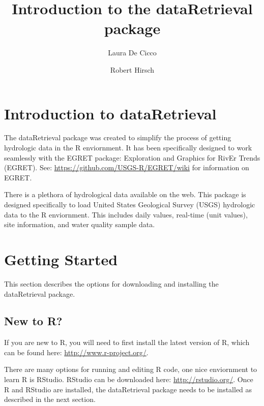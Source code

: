 \documentclass[a4paper,11pt]{article}
\begin{document}


\title{Introduction to the dataRetrieval package}
\author[1]{Laura De Cicco}
\author[1]{Robert Hirsch}



\maketitle
\tableofcontents

\section{Introduction to dataRetrieval}
The dataRetrieval package was created to simplify the process of getting hydrologic data in the R enviornment. It has been specifically designed to work seamlessly with the EGRET package: Exploration and Graphics for RivEr Trends (EGRET). See: \url{https://github.com/USGS-R/EGRET/wiki} for information on EGRET.

There is a plethora of hydrological data available on the web. This package is designed specifically to load United States Geological Survey (USGS) hydrologic data to the R enviornment. This includes daily values, real-time (unit values), site information, and water quality sample data. 

\section{Getting Started}
This section describes the options for downloading and installing the dataRetrieval package.
\subsection{New to R?}
If you are new to R, you will need to first install the latest version of R, which can be found here: \url{http://www.r-project.org/}.

There are many options for running and editing R code, one nice enviornment to learn R is RStudio. RStudio can be downloaded here: \url{http://rstudio.org/}. Once R and RStudio are installed, the dataRetrieval package needs to be installed as described in the next section.
\end{document}

